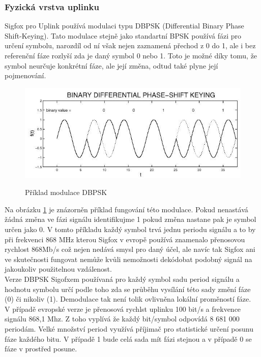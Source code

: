 \documentclass{ctuthesis}
\begin{document}
\subsubsection{Fyzická vrstva uplinku}
Sigfox pro Uplink používá modulaci typu DBPSK (Differential Binary Phase Shift-Keying). Tato modulace stejně jako standartní BPSK používá fázi pro určení symbolu, narozdíl od ní však nejen zaznamená přechod z 0 do 1, ale i bez referenční fáze rozlyší zda je daný symbol 0 nebo 1. Toto je možné díky tomu, že symbol neurčuje konkrétní fáze, ale její změna, odtud také plyne její pojmenování. \\
\begin{figure}
\caption{Příklad modulace DBPSK \cite{dbpsk}}
\includegraphics[width=1\textwidth]{./images/dbpsk.jpg}
\label{dbpsk}
\end{figure}
Na obrázku \ref{dbpsk} je znázorněn příklad fungování této modulace. Pokud nenastává žádná změna ve fázi signálu identifikujme 1 pokud změna nastane pak je symbol určen jako 0. V tomto příkladu každý symbol trvá jednu periodu signálu a to by při frekvenci 868 MHz kterou Sigfox v evropě používá znamenalo přenosovou rychlost 868Mb/s což nejen nedává smysl pro daný účel, ale navíc tak Sigfox ani ve skutečnosti fungovat nemůže kvůli nemožnosti dekódobat podobný signál na jakoukoliv použitelnou vzdálenost.\\
Verze DBPSK Sigofxem používaná pro každý symbol sadu period signálu a hodnotu symbolu určí podle toho zda se průběhu vysílání této sady změní fáze (0) či nikoliv (1). Demodulace tak není tolik ovlivněna lokální proměností fáze.\\
V případě evropské verze je přenosová rychlst uplinku 100 bit/s a frekvence signálu 868,1 Mhz. Z toho vyplívá že každý bit/symbol odpovídá 8 681 000 periodám. Velké množství period využívá příjimač pro statistické určení posunu fáze každého bitu. V případě 1 bude celá sada mít fázi stejnou a v případě 0 se fáze v prostřed posune. \\
\end{document}
